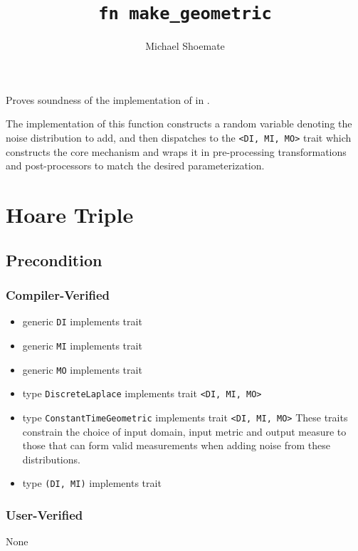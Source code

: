 \documentclass{article}
\title{\texttt{fn make\_geometric}}
\author{Michael Shoemate}
\date{}
\begin{document}
\maketitle

\contrib
Proves soundness of the implementation of  in .

The implementation of this function constructs a random variable denoting the noise distribution to add, 
and then dispatches to the \texttt{<DI, MI, MO>} trait
which constructs the core mechanism and wraps it in pre-processing transformations and post-processors to match the desired parameterization.

\section{Hoare Triple}
\subsection*{Precondition}
\subsubsection*{Compiler-Verified}
\begin{itemize}
    \item generic \texttt{DI} implements trait 
    \item generic \texttt{MI} implements trait 
    \item generic \texttt{MO} implements trait 
    \item type \texttt{DiscreteLaplace} implements trait \texttt{<DI, MI, MO>}
    \item type \texttt{ConstantTimeGeometric} implements trait \texttt{<DI, MI, MO>}
        These traits constrain the choice of input domain, input metric and output measure 
        to those that can form valid measurements when adding noise from these distributions.
    \item type \texttt{(DI, MI)} implements trait 
\end{itemize}

\subsubsection*{User-Verified}
None
\end{document}
